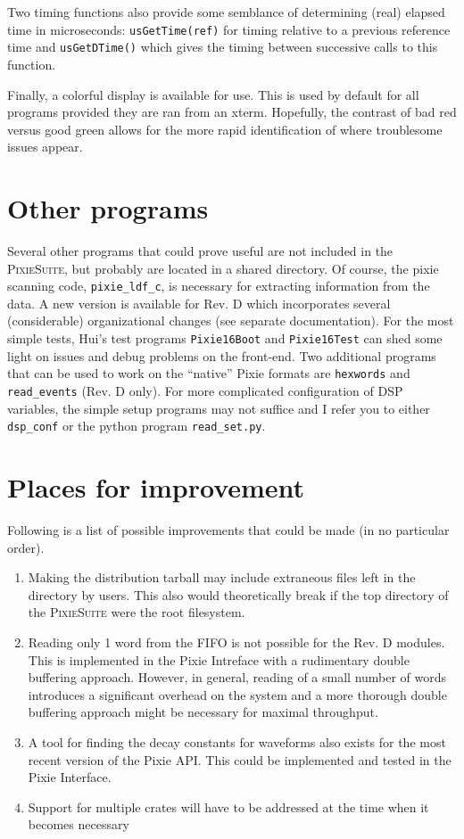 \documentclass{article}
\begin{document}
Two timing functions also provide some semblance of determining (real) elapsed time in microseconds: \texttt{usGetTime(ref)} for timing relative to a previous reference time and \texttt{usGetDTime()} which gives the timing between successive calls to this function.
 
Finally, a colorful display is available for use. This is used by default for all programs provided they are ran from an xterm. Hopefully, the contrast of bad red versus good green allows for the more rapid identification of where troublesome issues appear.
\section{Other programs}
Several other programs that could prove useful are not included in the \textsc{PixieSuite}, but probably are located in a shared directory. Of course, the pixie scanning code, \texttt{pixie\_ldf\_c}, is necessary for extracting information from the data. A new version is available for Rev. D which incorporates several (considerable) organizational changes (see separate documentation). For the most simple tests, Hui's test programs \texttt{Pixie16Boot} and \texttt{Pixie16Test} can shed some light on issues and debug problems on the front-end. Two additional programs that can be used to work on the ``native'' Pixie formats are \texttt{hexwords} and \texttt{read\_events} (Rev. D only). For more complicated configuration of DSP variables, the simple setup programs may not suffice and I refer you to either \texttt{dsp\_conf} or the python program \texttt{read\_set.py}.

\section{Places for improvement}
Following is a list of possible improvements that could be made (in no particular order).
\begin{enumerate}
\item Making the distribution tarball may include extraneous files left in the directory by users. This also would theoretically break if the top directory of the \textsc{PixieSuite} were the root filesystem.
\item Reading only 1 word from the FIFO is not possible for the Rev. D modules. This is implemented in the Pixie Intreface with a rudimentary double buffering approach. However, in general, reading of a small number of words introduces a significant overhead on the system and a more thorough double buffering approach might be necessary for maximal throughput.
\item A tool for finding the decay constants for waveforms also exists for the most recent version of the Pixie API. This could be implemented and tested in the Pixie Interface.
\item Support for multiple crates will have to be addressed at the time when it becomes necessary
\end{enumerate}
\end{document}
